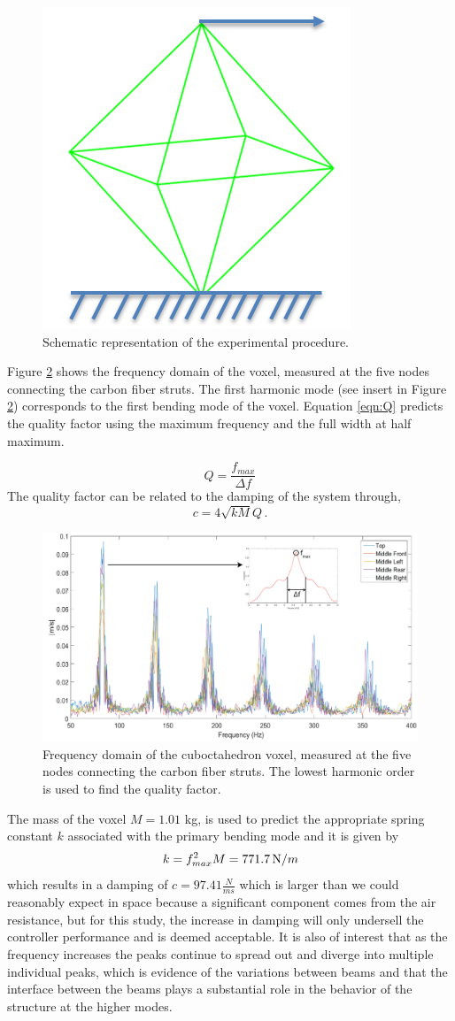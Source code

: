 \documentclass[11pt]{ucthesis}
\begin{document}
\begin{figure}[h]
\centering
\includegraphics[width=0.25\linewidth]{Figures/experimentalSetupDiagram.png}
\caption{Schematic representation of the experimental procedure. }
\label{fig:setUpD}
\end{figure}
Figure \ref{fig:FFTandQ} shows the frequency domain of the voxel, measured at the five nodes connecting the carbon fiber struts. The first harmonic mode (see insert in Figure \ref{fig:FFTandQ}) corresponds to the first bending mode of the voxel. Equation \ref{eqn:Q} predicts the quality factor using the maximum frequency and the full width at half maximum.

\begin{equation}
Q = \frac{f_{max}}{\Delta f}
\label{eqn:Q}
\end{equation}
The quality factor can be related to the damping of the system through,
\begin{equation}
c = 4 \sqrt{k M} Q \,.
\label{eqn:Q2c}
\end{equation}

\begin{figure}[h]
\centering
\includegraphics[width=0.75\linewidth]{Figures/FFTandQ.png}
\caption{Frequency domain of the cuboctahedron voxel, measured at the five nodes connecting the carbon fiber struts. The lowest harmonic order is used to find the quality factor.}
\label{fig:FFTandQ}
\end{figure}
The mass of the voxel $M=1.01$ kg, is used to predict the appropriate spring constant $k$ associated with the primary bending mode and it is given by
\begin{equation}
k = f_{max}^2 M = 771.7 \, {\mbox N/m}
\label{eqn:kfm}
\end{equation}
which results in a damping of $c = 97.41 \frac{N}{ms}$ which is larger than we could reasonably expect in space because a significant component comes from the air resistance, but for this study, the increase in damping will only undersell the controller performance and is deemed acceptable. It is also of interest that as the frequency increases the peaks continue to spread out and diverge into multiple individual peaks, which is evidence of the variations between beams and that the interface between the beams plays a substantial role in the behavior of the structure at the higher modes.
\end{document}
